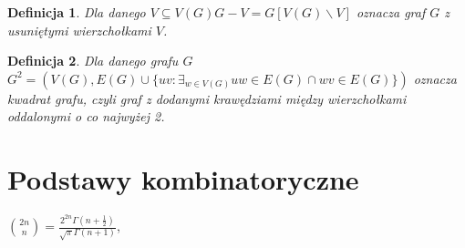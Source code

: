 \documentclass{pracamgr}
\newtheorem{defi}{Definicja}[section] %
\begin{document}
   \begin{defi}\label{roznica grafow}
    Dla danego $V\subseteq V(G)$\quad $G-V=G[V(G)\backslash V]$ oznacza \emph{graf $G$ z usuniętymi wierzchołkami $V$}.
   \end{defi}
   \begin{defi}\label{kwadrat grafu}
    Dla danego grafu $G$\newline $G^2=(V(G),E(G)\cup\{uv:\exists_{w\in V(G)}uw\in E(G)\cap wv\in E(G)\})$
    oznacza \emph{kwadrat grafu}, czyli graf z dodanymi krawędziami między wierzchołkami oddalonymi o co najwyżej 2.
   \end{defi}
  \section{Podstawy kombinatoryczne}
   ${2n \choose n}=\frac{2^{2n}\Gamma(n+\frac{1}{2})}{\sqrt{\pi}\Gamma(n+1)}$,\quad\quad
\end{document}
